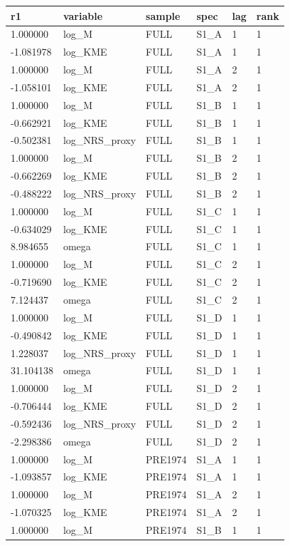 \begin{tabular}{llllll}
\hline
r1 & variable & sample & spec & lag & rank \\
\hline
1.000000 & log\_M & FULL & S1\_A & 1 & 1 \\
-1.081978 & log\_KME & FULL & S1\_A & 1 & 1 \\
1.000000 & log\_M & FULL & S1\_A & 2 & 1 \\
-1.058101 & log\_KME & FULL & S1\_A & 2 & 1 \\
1.000000 & log\_M & FULL & S1\_B & 1 & 1 \\
-0.662921 & log\_KME & FULL & S1\_B & 1 & 1 \\
-0.502381 & log\_NRS\_proxy & FULL & S1\_B & 1 & 1 \\
1.000000 & log\_M & FULL & S1\_B & 2 & 1 \\
-0.662269 & log\_KME & FULL & S1\_B & 2 & 1 \\
-0.488222 & log\_NRS\_proxy & FULL & S1\_B & 2 & 1 \\
1.000000 & log\_M & FULL & S1\_C & 1 & 1 \\
-0.634029 & log\_KME & FULL & S1\_C & 1 & 1 \\
8.984655 & omega & FULL & S1\_C & 1 & 1 \\
1.000000 & log\_M & FULL & S1\_C & 2 & 1 \\
-0.719690 & log\_KME & FULL & S1\_C & 2 & 1 \\
7.124437 & omega & FULL & S1\_C & 2 & 1 \\
1.000000 & log\_M & FULL & S1\_D & 1 & 1 \\
-0.490842 & log\_KME & FULL & S1\_D & 1 & 1 \\
1.228037 & log\_NRS\_proxy & FULL & S1\_D & 1 & 1 \\
31.104138 & omega & FULL & S1\_D & 1 & 1 \\
1.000000 & log\_M & FULL & S1\_D & 2 & 1 \\
-0.706444 & log\_KME & FULL & S1\_D & 2 & 1 \\
-0.592436 & log\_NRS\_proxy & FULL & S1\_D & 2 & 1 \\
-2.298386 & omega & FULL & S1\_D & 2 & 1 \\
1.000000 & log\_M & PRE1974 & S1\_A & 1 & 1 \\
-1.093857 & log\_KME & PRE1974 & S1\_A & 1 & 1 \\
1.000000 & log\_M & PRE1974 & S1\_A & 2 & 1 \\
-1.070325 & log\_KME & PRE1974 & S1\_A & 2 & 1 \\
1.000000 & log\_M & PRE1974 & S1\_B & 1 & 1 \\

\end{tabular}
